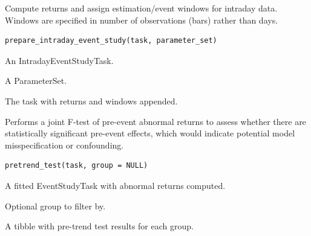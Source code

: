 \documentclass[a4paper]{book}
\begin{document}
%
\begin{Description}
Compute returns and assign estimation/event windows for intraday data.
Windows are specified in number of observations (bars) rather than days.
\end{Description}
%
\begin{Usage}
\begin{verbatim}
prepare_intraday_event_study(task, parameter_set)
\end{verbatim}
\end{Usage}
%
\begin{Arguments}
\begin{ldescription}
\item[\code{task}] An IntradayEventStudyTask.

\item[\code{parameter\_set}] A ParameterSet.
\end{ldescription}
\end{Arguments}
%
\begin{Value}
The task with returns and windows appended.
\end{Value}
%
\begin{Description}
Performs a joint F-test of pre-event abnormal returns to assess whether
there are statistically significant pre-event effects, which would
indicate potential model misspecification or confounding.
\end{Description}
%
\begin{Usage}
\begin{verbatim}
pretrend_test(task, group = NULL)
\end{verbatim}
\end{Usage}
%
\begin{Arguments}
\begin{ldescription}
\item[\code{task}] A fitted EventStudyTask with abnormal returns computed.

\item[\code{group}] Optional group to filter by.
\end{ldescription}
\end{Arguments}
%
\begin{Value}
A tibble with pre-trend test results for each group.
\end{Value}
\end{document}
